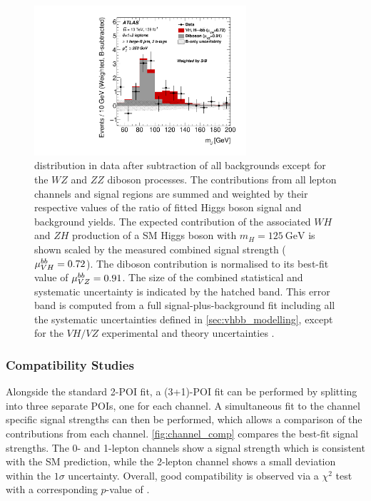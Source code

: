 \begin{figure}[!htbp]
  \centering
  \includegraphics[width=0.7\textwidth]{chapters/6.vhbb_boosted/figs/Region_BMin250_incFat1_Fat1_incJet1_Y6051_DSRnoaddbjetsr_T2_L3_distmBB_Higgsweighted_BkgSub_GlobalFit_unconditionnal_mu1.pdf}
  \caption{
    \mJ distribution in data after subtraction of all backgrounds except for the $WZ$ and $ZZ$ diboson processes. 
    The contributions from all lepton channels and signal regions are summed and weighted by their
    respective values of the ratio of fitted Higgs boson signal and
    background yields. The expected contribution of the associated $WH$
    and $ZH$ production of a SM Higgs boson with $m_H = \SI{125}{\GeV}$ is
    shown scaled by the measured combined signal strength
    ($\mu_{VH}^{bb}=0.72$). The diboson contribution is normalised to its
    best-fit value of $\mu_{VZ}^{bb}=0.91$. The size of the combined
    statistical and systematic uncertainty is indicated by the hatched
    band. This error band is computed from a full signal-plus-background
    fit including all the systematic uncertainties defined in
    \cref{sec:vhbb_modelling}, except for the $VH/VZ$
    experimental and theory uncertainties  \cite{HIGG-2018-52}.  
  }
  \label{fig:money_plot}
\end{figure}

\subsubsection{Compatibility Studies}

Alongside the standard 2-POI fit, a (3+1)-POI fit can be performed by splitting \muVH into three separate POIs, one for each channel.
A simultaneous fit to the channel specific signal strengths can then be performed, which allows a comparison of the contributions from each channel.
\cref{fig:channel_comp} compares the best-fit signal strengths.
The 0- and 1-lepton channels show a signal strength which is consistent with the SM prediction, while the 2-lepton channel shows a small deviation within the $1\sigma$ uncertainty.
Overall, good compatibility is observed via a $\chi^2$ test with a corresponding $p$-value of .

